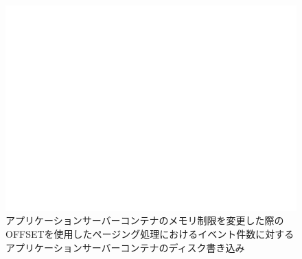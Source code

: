 \documentclass[../../../../../main]{subfiles}
\begin{document}
    \begin{figure}[H]
        \centering
        \includegraphics[width=12cm]{graph}
        \caption{アプリケーションサーバーコンテナのメモリ制限を変更した際のOFFSETを使用したページング処理におけるイベント件数に対するアプリケーションサーバーコンテナのディスク書き込み}
        \label{fig:paging-offset-change-app-memory-limit-app-disk-in-app_1024-db_1_1024}
    \end{figure}
\end{document}
